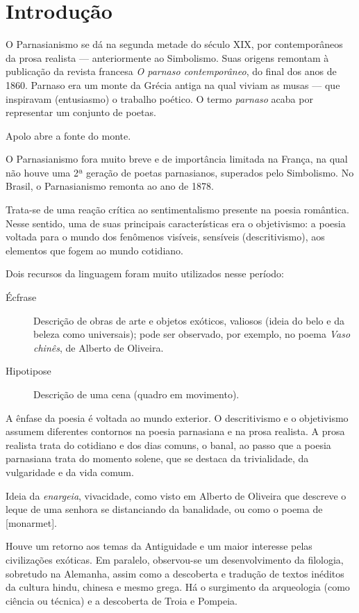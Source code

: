 
\chapter{Introdução}

O Parnasianismo se dá na segunda metade do século XIX, por contemporâneos da prosa realista — anteriormente ao Simbolismo. Suas origens remontam à publicação da revista francesa \textit{O parnaso contemporâneo}, do final dos anos de 1860. Parnaso era um monte da Grécia antiga na qual viviam as musas — que inspiravam (entusiasmo) o trabalho poético. O termo \textit{parnaso} acaba por representar um conjunto de poetas.

Apolo abre a fonte do monte.

O Parnasianismo fora muito breve e de importância limitada na França, na qual não houve uma 2ª geração de poetas parnasianos, superados pelo Simbolismo. No Brasil, o Parnasianismo remonta ao ano de 1878.

Trata-se de uma reação crítica ao sentimentalismo presente na poesia romântica. Nesse sentido, uma de suas principais características era o objetivismo: a poesia voltada para o mundo dos fenômenos visíveis, sensíveis (descritivismo), aos elementos que fogem ao mundo cotidiano.

Dois recursos da linguagem foram muito utilizados nesse período:

\begin{description}
\item[Écfrase] Descrição de obras de arte e objetos exóticos, valiosos (ideia do belo e da beleza como universais); pode ser observado, por exemplo, no poema \textit{Vaso chinês}, de Alberto de Oliveira.
\item[Hipotipose] Descrição de uma cena (quadro em movimento).
\end{description}

A ênfase da poesia é voltada ao mundo exterior. O descritivismo e o objetivismo assumem diferentes contornos na poesia parnasiana e na prosa realista. A prosa realista trata do cotidiano e dos dias comuns, o banal, ao passo que a poesia parnasiana trata do momento solene, que se destaca da trivialidade, da vulgaridade e da vida comum.

Ideia da \textit{enargeia}, vivacidade, como visto em Alberto de Oliveira que descreve o leque de uma senhora se distanciando da banalidade, ou como o poema de [monarmet].

Houve um retorno aos temas da Antiguidade e um maior interesse pelas civilizações exóticas. Em paralelo, observou-se um desenvolvimento da filologia, sobretudo na Alemanha, assim como a descoberta e tradução de textos inéditos da cultura hindu, chinesa e mesmo grega. Há o surgimento da arqueologia (como ciência ou técnica) e a descoberta de Troia e Pompeia.

